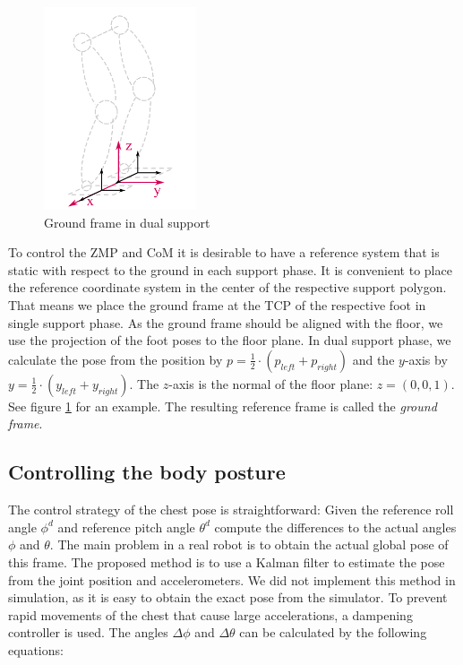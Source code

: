 \documentclass[english,ngerman]{KITreprt}
\begin{document}
\begin{figure}
\vspace*{-1em}
\includegraphics[width=0.4\textwidth]{images/ground_frame.png}
\caption{Ground frame in dual support}
\label{img:ground-frame}
\end{figure}

To control the ZMP and CoM it is desirable to have a reference system
that is static with respect to the ground in each support phase. It is
convenient to place the reference coordinate system in the center of the
respective support polygon. That means we place the ground frame at the
TCP of the respective foot in single support phase. As the ground frame
should be aligned with the floor, we use the projection of the foot
poses to the floor plane. In dual support phase, we calculate the pose
from the position by $p = \frac{1}{2} \cdot (p_{left} + p_{right})$ and
the $y$-axis by $y = \frac{1}{2} \cdot (y_{left} + y_{right})$. The
$z$-axis is the normal of the floor plane: $z = (0, 0, 1)$. See figure
\ref{img:ground-frame} for an example. The resulting reference frame is
called the \emph{ground frame}.

\subsection{Controlling the body
posture}\label{controlling-the-body-posture}

The control strategy of the chest pose is straightforward: Given the
reference roll angle $\phi^d$ and reference pitch angle $\theta^d$
compute the differences to the actual angles $\phi$ and $\theta$. The
main problem in a real robot is to obtain the actual global pose of this
frame. The proposed method is to use a Kalman filter to estimate the
pose from the joint position and accelerometers. We did not implement
this method in simulation, as it is easy to obtain the exact pose from
the simulator. To prevent rapid movements of the chest that cause large
accelerations, a dampening controller is used. The angles $\Delta \phi$
and $\Delta \theta$ can be calculated by the following equations:
\end{document}
